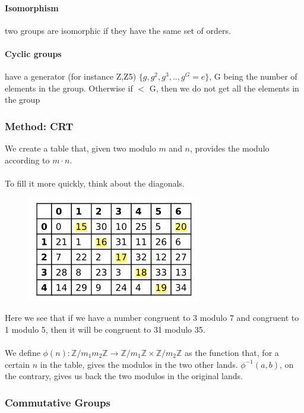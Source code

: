 \documentclass{article}
\begin{document}
\paragraph{Isomorphism} two groups are isomorphic if they have the same set of orders.

\paragraph{Cyclic groups} have a generator (for instance Z,Z5)
$\{ g, g^2, g^3, .., g^G = e \}$, G being the number of elements in the group. Otherwise if $ < $ G, then we do not get all the elements in the group

\subsubsection{Method: CRT}

We create a table that, given two modulo \( m \) and \( n \), provides the modulo according to \( m \cdot n \).\\\\
To fill it more quickly, think about the diagonals.

\begin{figure}[h]
    \centering
    \includegraphics[width=0.5\linewidth]{crt.png}
    \label{fig:enter-label}
\end{figure}

Here we see that if we have a number congruent to 3 modulo 7 and congruent to 1 modulo 5, then it will be congruent to 31 modulo 35.\\\\
We define \(\phi(n) : \mathbb{Z}/m_1m_2\mathbb{Z} \rightarrow \mathbb{Z}/m_1\mathbb{Z} \times \mathbb{Z}/m_2\mathbb{Z}\) as the function that, for a certain \( n \) in the table, gives the modulos in the two other lands.
\(\phi^{-1}(a, b)\), on the contrary, gives us back the two modulos in the original lands.

\subsubsection{Commutative Groups}
\end{document}
